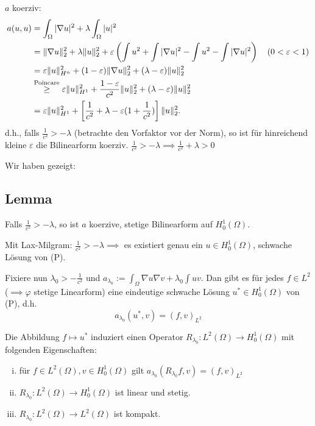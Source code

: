 $a$ koerziv: 
\begin{align*}
a(u,u) 
&= \int_\Omega |\nabla u|^2 + \lambda \int_\Omega |u|^2 \\
&= \lVert \nabla u \rVert_2^2 + \lambda \lVert u \rVert_2^2 + \varepsilon \left( \int u^2 + \int |\nabla u|^2 - \int u^2 - \int |\nabla u|^2 \right) \quad (0 < \varepsilon < 1) \\
&= \varepsilon \lVert u \rVert_{H^n}^2 + (1 - \varepsilon) \lVert \nabla u \rVert_2^2 + (\lambda - \varepsilon) \lVert u \rVert_2^2 \\
&\overset{\text{Poincare}}{\geq} \varepsilon \lVert u \rVert_{H^1}^2 + \frac{1 - \varepsilon}{c^2} \lVert u \rVert_2^2 + (\lambda - \varepsilon) \lVert u \rVert_2^2 \\
&= \varepsilon \lVert u \rVert_{H^1}^2 + \left[ \frac{1}{c^2} + \lambda - \varepsilon (1 + \frac{1}{c^2}) \right] \lVert u \rVert_2^2.
\end{align*}
d.h., falls $\frac{1}{c^2} > -\lambda$ (betrachte den Vorfaktor vor der Norm), so ist für hinreichend kleine $\varepsilon$ die Bilinearform koerziv.
{\tiny{$\frac{1}{c^2} > -\lambda \implies \frac{1}{c^2} + \lambda > 0$}}

Wir haben gezeigt:
\subsection{Lemma}
Falls $\frac{1}{c^2} > - \lambda$, so ist $a$ koerzive, stetige Bilinearform auf $H_0^1(\Omega)$.

Mit Lax-Milgram: $\frac{1}{c^2} > -\lambda \implies$ es existiert genau ein $u \in H_0^1(\Omega)$, schwache Lösung von (P).

Fixiere nun $\lambda_0 > -\frac{1}{c^2}$ und $a_{\lambda_0} := \int_\Omega \nabla u \nabla v + \lambda_0 \int uv$.
Dan gibt es für jedes $f \in L^2$ ($\implies \varphi$ stetige Linearform) eine eindeutige schwache Lösung $u^* \in H_0^1(\Omega)$ von (P), d.h.
$$
a_{\lambda_0}(u^*, v) = (f,v)_{L^2}
$$

Die Abbildung $f \mapsto u^*$ induziert einen Operator $R_{\lambda_0} \colon L^2(\Omega) \to H_0^1(\Omega)$ mit folgenden Eigenschaften:
\begin{enumerate}[i)]
  \item für $f \in L^2(\Omega), v \in H_0^1(\Omega)$ gilt $a_{\lambda_0}(R_{\lambda_0} f, v) = (f,v)_{L^2}$
  \item $R_{\lambda_0} \colon L^2(\Omega) \to H_0^1(\Omega)$ ist linear und stetig.
  \item $R_{\lambda_0} \colon L^2(\Omega) \to L^2(\Omega)$ ist kompakt.
\end{enumerate}

